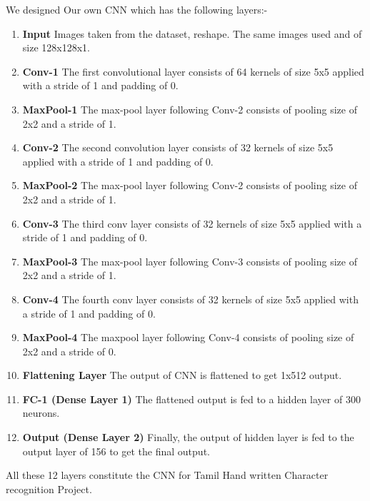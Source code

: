 \documentclass[12pt,a4paper]{article}
\begin{document}
\quad We designed Our own CNN which has the following layers:-
\begin{enumerate}
    \item \textbf{Input} Images taken from the dataset, reshape. The same images used and of size 128x128x1. 
    \item \textbf{Conv-1} The first convolutional layer consists of 64 kernels of size 5x5 applied with a stride of 1 and padding of 0.
    \item \textbf{MaxPool-1} The max-pool layer following Conv-2 consists of pooling size of 2x2 and a stride of 1.
    \item \textbf{Conv-2} The second convolution layer consists of 32 kernels of size 5x5 applied with a stride of 1 and padding of 0.
    \item \textbf{MaxPool-2} The max-pool layer following Conv-2 consists of pooling size of 2x2 and a stride of 1.
    \item \textbf{Conv-3} The third conv layer consists of 32 kernels of size 5x5 applied with a stride of 1 and padding of 0.
    \item \textbf{MaxPool-3} The max-pool layer following Conv-3 consists of pooling size of 2x2 and a stride of 1.
    \item \textbf{Conv-4} The fourth conv layer consists of 32 kernels of size 5x5 applied with a stride of 1 and padding of 0.
    \item \textbf{MaxPool-4} The maxpool layer following Conv-4 consists of pooling size of 2x2 and a stride of 0.
    \item \textbf{Flattening Layer} The output of CNN is flattened to get 1x512 output.
    \item \textbf{FC-1 (Dense Layer 1)} The flattened output is fed to a hidden layer of 300 neurons.
    \item \textbf{Output (Dense Layer 2)} Finally, the output of hidden layer is fed to the output layer of 156 to get the final output.
\end{enumerate}
    
\quad All these 12 layers constitute the CNN for Tamil Hand written Character recognition Project.

\newpage
\end{document}
